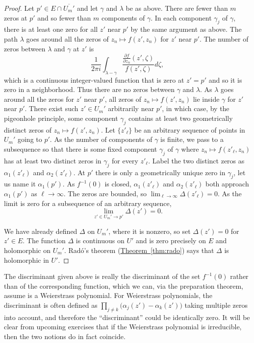 \documentclass[12pt,openany]{book}
\theoremstyle{plain}
\theoremstyle{remark}
\theoremstyle{definition}
\theoremstyle{exercise}
\theoremstyle{example}
\newcommand{\thmref}[1]{\hyperref[#1]{Theorem~\ref*{#1}}}
\begin{document}
\begin{proof}
Let $p' \in E \cap \overline{U_m'}$ and let
$\gamma$ and $\lambda$ be as above.
There are fewer than $m$ zeros at $p'$
and so fewer than $m$ components of $\gamma$.
In each component $\gamma_j$ of $\gamma$, there is
at least one zero for all $z'$ near $p'$ by the same argument as above.
The path $\lambda$ goes around all the zeros of 
$z_n \mapsto f(z',z_n)$ for $z'$ near $p'$.
The number of zeros between $\lambda$ and $\gamma$ at $z'$ is
\begin{equation*}
\frac{1}{2\pi i}
\int_{\lambda - \gamma}
\frac{\frac{\partial f}{\partial z_n}(z',\zeta)}{f(z',\zeta)} d\zeta ,
\end{equation*}
which is a continuous integer-valued function that is zero at $z'=p'$
and so it is zero in a neighborhood.  Thus there are no zeros between
$\gamma$ and $\lambda$.
As $\lambda$ goes around all the zeros for $z'$ near $p'$,
all zeros of $z_n \mapsto f(z',z_n)$
lie inside $\gamma$ for $z'$ near $p'$.
There exist such $z' \in U_m'$ arbitrarily near $p'$,
in which case, by the pigeonhole principle, some
component $\gamma_j$ contains at least two geometrically distinct zeros of
$z_n \mapsto f(z',z_n)$.
Let $\{ z'_\ell \}$
be an arbitrary sequence of points in $U_m'$ going to $p'$.
As the number of components of $\gamma$ is finite, we pass to a subsequence
so that there is some fixed component $\gamma_j$ of $\gamma$
where
$z_n \mapsto f(z'_\ell,z_n)$ has at least two distinct zeros in $\gamma_j$ for every $z'_\ell$.
Label the two distinct zeros
as $\alpha_1(z'_\ell)$ and $\alpha_2(z'_\ell)$.
At $p'$ there is only a geometrically unique zero in $\gamma_j$, let
us name it $\alpha_1(p')$.
As $f^{-1}(0)$ is closed,
$\alpha_1(z'_\ell)$ and $\alpha_2(z'_\ell)$ both approach $\alpha_1(p')$ as
$\ell \to \infty$.
The zeros are bounded, so
$\lim_{\ell \to \infty} \Delta(z'_\ell) = 0$.  As the limit is zero for a
subsequence of an arbitrary sequence,
\begin{equation*}
\lim_{z' \in U_m' \to p'} \Delta(z') = 0 .
\end{equation*}

We have already defined $\Delta$ on $U_m'$, where it is nonzero,
so set $\Delta(z') = 0$ for $z' \in E$.
The function $\Delta$ is continuous on $U'$ and is zero precisely on
$E$ and holomorphic on $U_m'$.
Rad{\'o}'s theorem
(\thmref{thm:rado}) says that $\Delta$ is holomorphic in $U'$.
\end{proof}

The discriminant given above is really the discriminant of the set
$f^{-1}(0)$ rather than of the corresponding function, which we can,
via the preparation theorem, assume is a Weierstrass polynomial.
For Weierstrass polynomials, the discriminant is often defined as
$\prod_{j \neq k} \bigl( \alpha_j(z') - \alpha_k(z') \bigr)$ taking
multiple zeros into account, and therefore the ``discriminant'' could be
identically zero.  It will be clear from upcoming exercises that if
the Weierstrass polynomial is irreducible, then the two notions do in fact
coincide.
\end{document}

